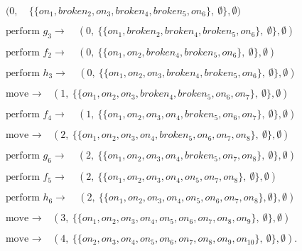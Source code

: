\documentclass[]{jair}
\begin{document}
\small
\begin{align*}
\begin{split}
(0, & \ \{\{on_1, broken_2, on_3, broken_4, broken_5, on_6\},\ \emptyset\}, \emptyset)
\end{split}
\\\begin{split}
\text{perform } g_3 \to \ & (0, \ \{\{on_1, broken_2, broken_4, broken_5, on_6\},\ \emptyset\}, \emptyset)
\end{split}
\\\begin{split}
\text{perform } f_2 \to \ & (0, \ \{\{on_1, on_2, broken_4, broken_5, on_6\},\ \emptyset\}, \emptyset)
\end{split}
\\\begin{split}
\text{perform } h_3 \to \ & (0, \ \{\{on_1, on_2, on_3, broken_4, broken_5, on_6\},\  \emptyset\}, \emptyset)
\end{split}
\\\begin{split}
\text{move } \to \ & (1, \ \{\{on_1, on_2, on_3, broken_4, broken_5, on_6, on_7\}, \ \emptyset\}, \emptyset)
\end{split}
\\\begin{split}
\text{perform } f_4 \to \ & (1, \ \{\{on_1, on_2, on_3, on_4, broken_5, on_6, on_7\},\ \emptyset\}, \emptyset)
\end{split}
\\\begin{split}
\text{move } \to \ & (2, \ \{\{on_1, on_2, on_3, on_4, broken_5, on_6, on_7, on_8\},\ \emptyset\}, \emptyset)
\end{split}
\\\begin{split}
\text{perform } g_6 \to \ & (2, \ \{\{on_1, on_2, on_3, on_4, broken_5, on_7, on_8\}, \ \emptyset\}, \emptyset)
\end{split}
\\\begin{split}
\text{perform } f_5 \to \ & (2, \ \{\{on_1, on_2, on_3, on_4, on_5, on_7, on_8\},\ \emptyset\}, \emptyset)
\end{split}
\\\begin{split}
\text{perform } h_6 \to \ & (2, \ \{\{on_1, on_2, on_3, on_4, on_5, on_6, on_7, on_8\},\emptyset\}, \emptyset)
\end{split}
\\\begin{split}
\text{move } \to \ & (3, \ \{\{on_1, on_2, on_3, on_4, on_5, on_6, on_7, on_8, on_9\},\ \emptyset\}, \emptyset)
\end{split}
\\\begin{split}
\text{move } \to \ & (4, \ \{\{on_2, on_3, on_4, on_5, on_6, on_7, on_8, on_9, on_{10}\},\ \emptyset\}, \emptyset).
\end{split}
\end{align*}
\normalsize
\end{document}
